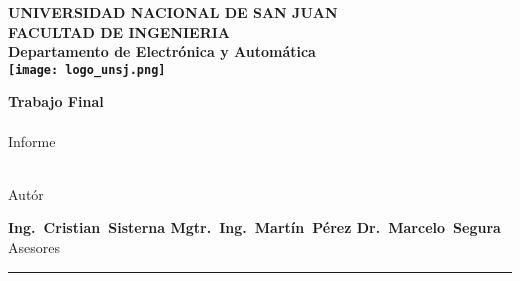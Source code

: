 \begin{titlepage}
  \begin{center}
    \begin{Large}
      \textbf{UNIVERSIDAD NACIONAL DE SAN JUAN\\
      \vspace*{0.05in}
      FACULTAD DE INGENIERIA\\
      \vspace*{0.05in}
      Departamento de Electrónica y Automática\\
      \vspace*{0.2in}
      \texttt{[image: logo\_unsj.png]}\\
      \vspace*{\fill}}
    \end{Large}
    \begin{Large}
      \textbf{Trabajo Final\\\MakeUppercase{\thetitle}} \\
      Informe\\
    \end{Large}
    \vspace*{\fill}
    \begin{large}
      \textbf{\theauthor}\\
      Autór\\
    \end{large}
    \vspace*{0.5in}
    \begin{large}
      \textbf{Ing.~Cristian~Sisterna \hspace*{\fill}
      Mgtr.~Ing.~Martín~Pérez \hspace*{\fill} Dr.~Marcelo~Segura \\}
      Asesores\\
    \end{large}
    \vspace{\fill}
    \rule{80mm}{0.1mm}\\
    \vspace{.1in}
    \the\year
  \end{center}

\end{titlepage}
